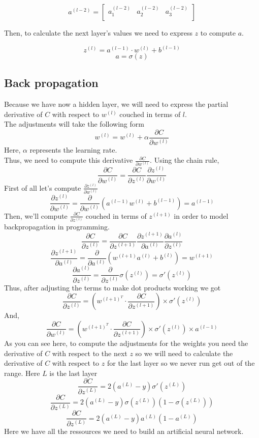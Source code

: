 \documentclass[]{report}
\begin{document}
\[a^{(l-2)}=\begin{bmatrix}
a^{(l-2)}_1 & a^{(l-2)}_2 & a^{(l-2)}_3 \\
\end{bmatrix}\]

{Then, to calculate the next layer's values we need to express $z$ to compute $a$.}

\[z^{(l)}=a^{(l-1)} \cdot w^{(l)}+b^{(l-1)}\]
\[a=\sigma (z)\]

\subsection{Back propagation}
{Because we have now a hidden layer, we will need to express the partial derivative of $C$ with respect to $w^{(l)}$ couched in terms of $l$.}\\
{The adjustments will take the following form}
\[w^{(l)}=w^{(l)}+\alpha \frac{\partial C}{\partial w^{(l)}}\]
{Here, $\alpha$ represents the learning rate.}\\
{Thus, we need to compute this derivative $\frac{\partial C}{\partial w^{(l)}}$.}
{Using the chain rule,}
\[\frac{\partial C}{\partial w^{(l)}}=\frac{\partial C}{\partial z^{(l)}} \frac{\partial z^{(l)}}{\partial w^{(l)}}\]
{First of all let's compute $\frac{\partial z^{(l)}}{\partial w^{(l)}}$}
\[\frac{\partial z^{(l)}}{\partial w^{(l)}} = \frac{\partial}{\partial w^{(l)}} \left( a^{(l-1)} w^{(l)} + b^{(l-1)} \right)=a^{(l-1)}\]
{Then, we'll compute $\frac{\partial C}{\partial z^{(l)}}$ couched in terms of $z^{(l+1)}$ in order to model backpropagation in programming.}
\[\frac{\partial C}{\partial z^{(l)}}=\frac{\partial C}{\partial z^{(l+1)}}\frac{\partial z^{(l+1)}}{\partial a^{(l)}}\frac{\partial a^{(l)}}{\partial z^{(l)}}\]
\[\frac{\partial z^{(l+1)}}{\partial a^{(l)}}=\frac{\partial}{\partial a^{(l)}} \left(w^{(l+1)} a^{(l)} + b^{(l)}\right)=w^{(l+1)}\]
\[\frac{\partial a^{(l)}}{\partial z^{(l)}}=\frac{\partial}{\partial z^{(l)}} \sigma \left(z^{(l)}\right)=\sigma\prime\left(z^{(l)}\right)\]
{Thus, after adjusting the terms to make dot products working we got}
\[\frac{\partial C}{\partial z^{(l)}}=\left(w^{(l+1)^{T}} \cdot \frac{\partial C}{\partial z^{(l+1)}} \right) \times \sigma\prime\left(z^{(l)}\right)\]
{And,}
\[\frac{\partial C}{\partial w^{(l)}}=\left(w^{(l+1)^{T}} \cdot \frac{\partial C}{\partial z^{(l+1)}} \right) \times \sigma\prime\left(z^{(l)}\right) \times a^{(l-1)}\]
{As you can see here, to compute the adjustments for the weights you need the derivative of $C$ with respect to the next $z$ so we will need to calculate the derivative of $C$ with respect to $z$ for the last layer so we never run get out of the range.}
{Here $L$ is the last layer}
\[\frac{\partial C}{\partial z^{(L)}}=2(a^{(L)}-y) \sigma\prime\left(z^{(L)}\right)\]
\[\frac{\partial C}{\partial z^{(L)}}=2(a^{(L)}-y)\sigma\left(z^{(L)}\right)\left(1-\sigma\left(z^{(L)}\right)\right)\]
\[\frac{\partial C}{\partial z^{(L)}}=2(a^{(L)}-y)a^{(L)}\left(1-a^{(L)}\right)\]
{Here we have all the ressources we need to build an artificial neural network.}
\end{document}
